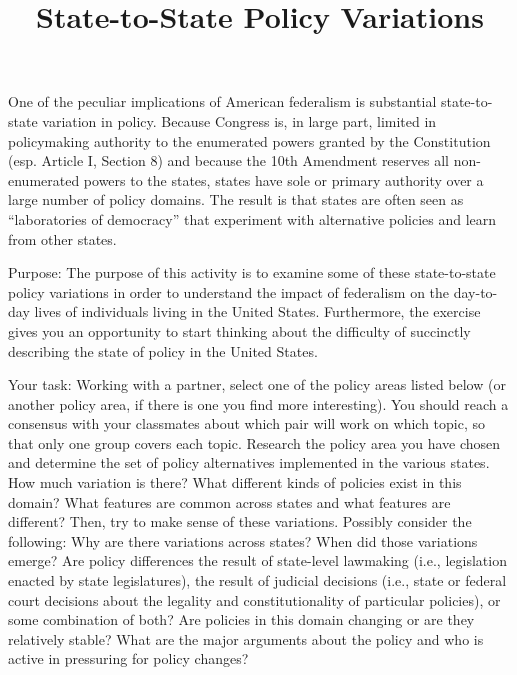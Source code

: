 \documentclass[a4, 12pt]{article}
\title{State-to-State Policy Variations\vspace{-2em}}
\author{}
\date{}
\begin{document}
\maketitle

\onehalfspacing

\noindent One of the peculiar implications of American federalism is substantial state-to-state variation in policy. Because Congress is, in large part, limited in policymaking authority to the enumerated powers granted by the Constitution (esp. Article I, Section 8) and because the 10th Amendment reserves all non-enumerated powers to the states, states have sole or primary authority over a large number of policy domains. The result is that states are often seen as ``laboratories of democracy'' that experiment with alternative policies and learn from other states.

\vspace{1em}
\noindent Purpose: The purpose of this activity is to examine some of these state-to-state policy variations in order to understand the impact of federalism on the day-to-day lives of individuals living in the United States. Furthermore, the exercise gives you an opportunity to start thinking about the difficulty of succinctly describing the state of policy in the United States.

\vspace{1em}
\noindent Your task: Working with a partner, select one of the policy areas listed below (or another policy area, if there is one you find more interesting). You should reach a consensus with your classmates about which pair will work on which topic, so that only one group covers each topic. Research the policy area you have chosen and determine the set of policy alternatives implemented in the various states. How much variation is there? What different kinds of policies exist in this domain? What features are common across states and what features are different? Then, try to make sense of these variations. Possibly consider the following: Why are there variations across states? When did those variations emerge? Are policy differences the result of state-level lawmaking (i.e., legislation enacted by state legislatures), the result of judicial decisions (i.e., state or federal court decisions about the legality and constitutionality of particular policies), or some combination of both? Are policies in this domain changing or are they relatively stable? What are the major arguments about the policy and who is active in pressuring for policy changes?
\end{document}
